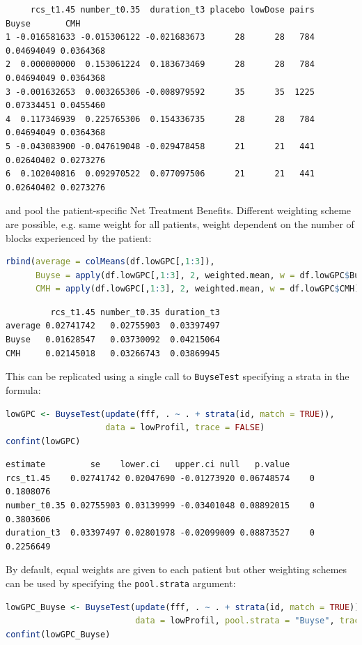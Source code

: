 \documentclass[12pt]{article}
\begin{document}
\label{}
\begin{verbatim}
     rcs_t1.45 number_t0.35  duration_t3 placebo lowDose pairs      Buyse       CMH
1 -0.016581633 -0.015306122 -0.021683673      28      28   784 0.04694049 0.0364368
2  0.000000000  0.153061224  0.183673469      28      28   784 0.04694049 0.0364368
3 -0.001632653  0.003265306 -0.008979592      35      35  1225 0.07334451 0.0455460
4  0.117346939  0.225765306  0.154336735      28      28   784 0.04694049 0.0364368
5 -0.043083900 -0.047619048 -0.029478458      21      21   441 0.02640402 0.0273276
6  0.102040816  0.092970522  0.077097506      21      21   441 0.02640402 0.0273276
\end{verbatim}


\noindent and pool the patient-specific Net Treatment
Benefits. Different weighting scheme are possible, e.g. same weight
for all patients, weight dependent on the number of blocks experienced
by the patient:
\begin{lstlisting}[language=r,numbers=none]
rbind(average = colMeans(df.lowGPC[,1:3]),
      Buyse = apply(df.lowGPC[,1:3], 2, weighted.mean, w = df.lowGPC$Buyse),
      CMH = apply(df.lowGPC[,1:3], 2, weighted.mean, w = df.lowGPC$CMH))
\end{lstlisting}

\label{}
\begin{verbatim}
         rcs_t1.45 number_t0.35 duration_t3
average 0.02741742   0.02755903  0.03397497
Buyse   0.01628547   0.03730092  0.04215064
CMH     0.02145018   0.03266743  0.03869945
\end{verbatim}


This can be replicated using a single call to \texttt{BuyseTest} specifying a
strata in the formula:
\begin{lstlisting}[language=r,numbers=none]
lowGPC <- BuyseTest(update(fff, . ~ . + strata(id, match = TRUE)),
                    data = lowProfil, trace = FALSE)
confint(lowGPC)
\end{lstlisting}

\label{}
\begin{verbatim}
estimate         se    lower.ci   upper.ci null   p.value
rcs_t1.45    0.02741742 0.02047690 -0.01273920 0.06748574    0 0.1808076
number_t0.35 0.02755903 0.03139999 -0.03401048 0.08892015    0 0.3803606
duration_t3  0.03397497 0.02801978 -0.02099009 0.08873527    0 0.2256649
\end{verbatim}


By default, equal weights are given to each patient but other
weighting schemes can be used by specifying the \texttt{pool.strata} argument:
\begin{lstlisting}[language=r,numbers=none]
lowGPC_Buyse <- BuyseTest(update(fff, . ~ . + strata(id, match = TRUE)),
                          data = lowProfil, pool.strata = "Buyse", trace = FALSE)
confint(lowGPC_Buyse)
\end{lstlisting}
\end{document}
